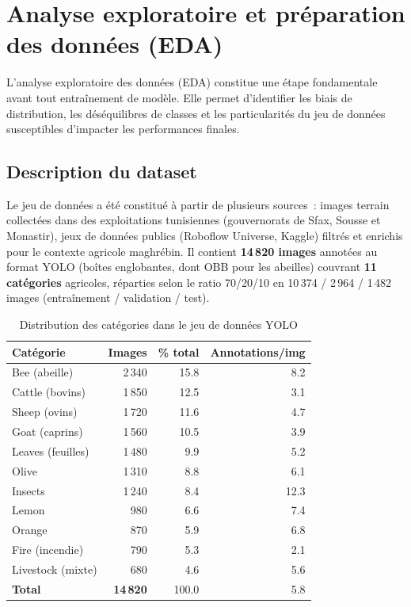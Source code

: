 \section{Analyse exploratoire et préparation des données (EDA)}

L'analyse exploratoire des données (EDA) constitue une étape fondamentale avant
tout entraînement de modèle. Elle permet d'identifier les biais de distribution,
les déséquilibres de classes et les particularités du jeu de données susceptibles
d'impacter les performances finales.

\subsection{Description du dataset}

Le jeu de données a été constitué à partir de plusieurs sources~: images terrain
collectées dans des exploitations tunisiennes (gouvernorats de Sfax, Sousse et Monastir),
jeux de données publics (Roboflow Universe, Kaggle) filtrés et enrichis pour le
contexte agricole maghrébin. Il contient \textbf{14\,820 images} annotées au format
YOLO (boîtes englobantes, dont OBB pour les abeilles) couvrant \textbf{11 catégories}
agricoles, réparties selon le ratio 70/20/10 en 10\,374 / 2\,964 / 1\,482 images
(entraînement / validation / test).

\begin{table}[H]
\centering
\caption[Distribution des catégories YOLO]{Distribution des catégories dans le jeu de données YOLO}
\label{tab:yolo_data}
\begin{tabular}{lrrr}
\toprule
\textbf{Catégorie} & \textbf{Images} & \textbf{\% total} & \textbf{Annotations/img} \\
\midrule
Bee (abeille)     & 2\,340 & 15.8 & 8.2 \\
Cattle (bovins)   & 1\,850 & 12.5 & 3.1 \\
Sheep (ovins)     & 1\,720 & 11.6 & 4.7 \\
Goat (caprins)    & 1\,560 & 10.5 & 3.9 \\
Leaves (feuilles) & 1\,480 &  9.9 & 5.2 \\
Olive             & 1\,310 &  8.8 & 6.1 \\
Insects           & 1\,240 &  8.4 & 12.3 \\
Lemon             &   980  &  6.6 & 7.4 \\
Orange            &   870  &  5.9 & 6.8 \\
Fire (incendie)   &   790  &  5.3 & 2.1 \\
Livestock (mixte) &   680  &  4.6 & 5.6 \\
\midrule
\textbf{Total}    & \textbf{14\,820} & 100.0 & 5.8 \\
\bottomrule
\end{tabular}
\end{table}

